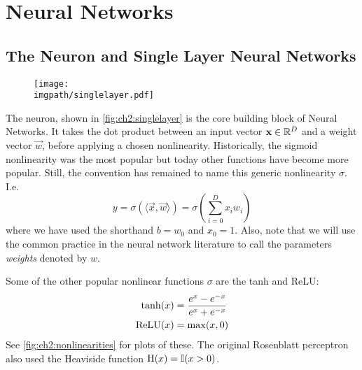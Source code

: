 \section{Neural Networks}\label{sec:ch2:cnns}
\subsection{The Neuron and Single Layer Neural Networks}

\begin{figure}
  \centering
  \texttt{[image: \\imgpath/singlelayer.pdf]}
  \label{fig:ch2:singlelayer}
\end{figure}

The neuron, shown in \autoref{fig:ch2:singlelayer} is the core building block of
Neural Networks. It takes the dot product between an input vector $\vec{x} \in
\reals[D]$ and a weight vector $\vec{w}$, before applying a chosen nonlinearity.
Historically, the sigmoid nonlinearity was the most popular but today other
functions have become more popular. Still, the convention has remained to name this
generic nonlinearity $\sigma$. I.e.
%
\begin{equation}
  y = \sigma(\langle\vec{x}, \vec{w}\rangle) = \sigma\left(\sum_{i=0}^{D} x_i w_i \right) 
\end{equation}
%
where we have used the shorthand $b=w_0$ and $x_0 = 1$. Also, note that we will
use the common practice in the neural network literature to call the parameters 
\emph{weights} denoted by $w$.

Some of the other popular nonlinear functions $\sigma$ are 
the tanh and ReLU:
\begin{align}
  \F{tanh}(x) &= \frac{e^{x} - e^{-x}}{e^{x} + e^{-x}} \label{eq:ch2:tanh}\\
  \F{ReLU}(x) &= \max (x, 0) \label{eq:ch2:relu}
\end{align}
%
See \autoref{fig:ch2:nonlinearities} for plots of these. The original Rosenblatt
perceptron \cite{rosenblatt_perceptron:_1958} also used the Heaviside function
$\F{H}(x) = \mathbb{I}(x > 0)$. %

